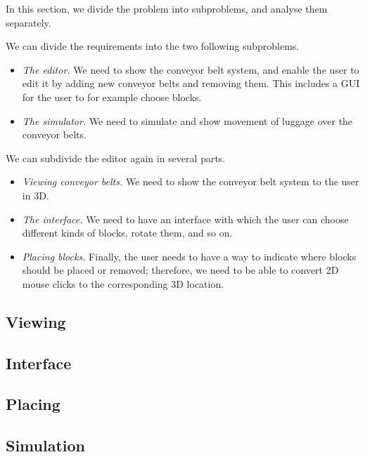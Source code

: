 In this section, we divide the problem into subproblems, and analyse them separately.

We can divide the requirements into the two following subproblems.
\begin{itemize}
 \item \emph{The editor.} We need to show the conveyor belt system, and enable the user to edit it by adding new conveyor belts and removing them. This includes a GUI for the user to for example choose blocks.
 \item \emph{The simulator.} We need to simulate and show movement of luggage over the conveyor belts.
\end{itemize}
We can subdivide the editor again in several parts.
\begin{itemize}
 \item \emph{Viewing conveyor belts.} We need to show the conveyor belt system to the user in 3D.
 \item \emph{The interface.} We need to have an interface with which the user can choose different kinds of blocks, rotate them, and so on.
 \item \emph{Placing blocks.} Finally, the user needs to have a way to indicate where blocks should be placed or removed; therefore, we need to be able to convert 2D mouse clicks to the corresponding 3D location.
\end{itemize}

\subsection{Viewing}


\subsection{Interface}


\subsection{Placing}


\subsection{Simulation}
